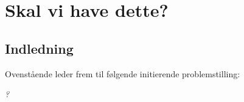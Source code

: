 \part{Skal vi have dette?}

\chapter{Indledning}




Ovenstående leder frem til følgende initierende problemstilling:
\begin{center}
\textit{?}
\end{center}